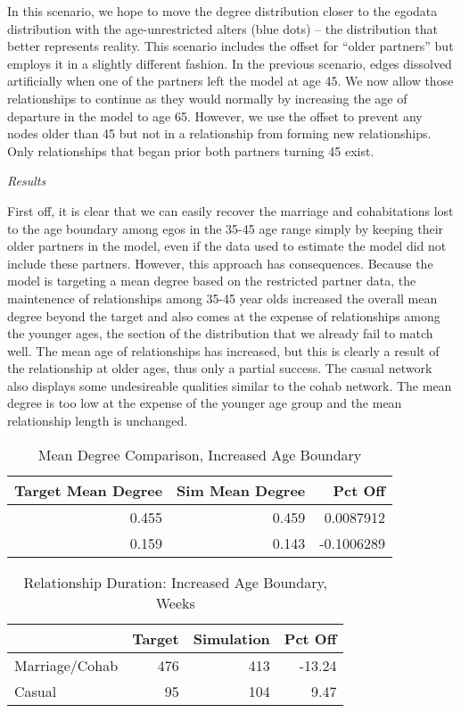 \documentclass [11pt, proquest] {uwthesis}[2015/03/03]
\begin{document}
In this scenario, we hope to move the degree distribution closer to the
egodata distribution with the age-unrestricted alters (blue dots) -- the
distribution that better represents reality. This scenario includes the
offset for ``older partners'' but employs it in a slightly different
fashion. In the previous scenario, edges dissolved artificially when one
of the partners left the model at age 45. We now allow those
relationships to continue as they would normally by increasing the age
of departure in the model to age 65. However, we use the offset to
prevent any nodes older than 45 but not in a relationship from forming
new relationships. Only relationships that began prior both partners
turning 45 exist.

\emph{Results}

First off, it is clear that we can easily recover the marriage and
cohabitations lost to the age boundary among egos in the 35-45 age range
simply by keeping their older partners in the model, even if the data
used to estimate the model did not include these partners. However, this
approach has consequences. Because the model is targeting a mean degree
based on the restricted partner data, the maintenence of relationships
among 35-45 year olds increased the overall mean degree beyond the
target and also comes at the expense of relationships among the younger
ages, the section of the distribution that we already fail to match
well. The mean age of relationships has increased, but this is clearly a
result of the relationship at older ages, thus only a partial success.
The casual network also displays some undesireable qualities similar to
the cohab network. The mean degree is too low at the expense of the
younger age group and the mean relationship length is unchanged.
\begin{table}

\caption{\label{tab:scen3-tab}Mean Degree Comparison, Increased Age Boundary}
\centering
\begin{tabular}[t]{rrr}
\toprule
Target Mean Degree & Sim Mean Degree & Pct Off\\
\midrule
0.455 & 0.459 & 0.0087912\\
0.159 & 0.143 & -0.1006289\\
\bottomrule
\end{tabular}
\end{table}
\begin{table}

\caption{\label{tab:scen3-duration}Relationship Duration: Increased Age Boundary, Weeks}
\centering
\begin{tabular}[t]{lrrr}
\toprule
  & Target & Simulation & Pct Off\\
\midrule
Marriage/Cohab & 476 & 413 & -13.24\\
Casual & 95 & 104 & 9.47\\
\bottomrule
\end{tabular}
\end{table}
\end{document}

